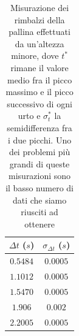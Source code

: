 \documentclass{article}
\begin{document}
\begin{table}
	\centering
	\begin{tabular}{c c}
		\toprule
		$\Delta t$ ($s$) & $\sigma_{\Delta t}$ ($s$) \\ \midrule
		$0.5484$ & $0.0005$ \\ \midrule
		$1.1012$ & $0.0005$ \\ \midrule
		$1.5470$ & $0.0005$ \\ \midrule
		$1.906$ & $0.002$ \\ \midrule
		$2.2005$ & $0.0005$ \\ \bottomrule
	\end{tabular}
	\caption{Misurazione dei rimbalzi della pallina effettuati da un'altezza minore, dove $t^*$ rimane il valore medio fra il picco massimo e il picco successivo di ogni urto e $\sigma_t^*$ la semidifferenza fra i due picchi. Uno dei problemi più grandi di queste misurazioni sono il basso numero di dati che siamo riusciti ad ottenere}
\end{table}
\end{document}
